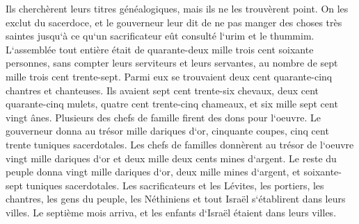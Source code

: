 \verse Ils cherchèrent leurs titres généalogiques, mais ils ne les trouvèrent point. On les exclut du sacerdoce, 
\verse et le gouverneur leur dit de ne pas manger des choses très saintes jusqu`à ce qu`un sacrificateur eût consulté l`urim et le thummim. 
\verse L`assemblée tout entière était de quarante-deux mille trois cent soixante personnes, 
\verse sans compter leurs serviteurs et leurs servantes, au nombre de sept mille trois cent trente-sept. Parmi eux se trouvaient deux cent quarante-cinq chantres et chanteuses. 
\verse Ils avaient sept cent trente-six chevaux, deux cent quarante-cinq mulets, 
\verse quatre cent trente-cinq chameaux, et six mille sept cent vingt ânes. 
\verse Plusieurs des chefs de famille firent des dons pour l`oeuvre. Le gouverneur donna au trésor mille dariques d`or, cinquante coupes, cinq cent trente tuniques sacerdotales. 
\verse Les chefs de familles donnèrent au trésor de l`oeuvre vingt mille dariques d`or et deux mille deux cents mines d`argent. 
\verse Le reste du peuple donna vingt mille dariques d`or, deux mille mines d`argent, et soixante-sept tuniques sacerdotales. 
\verse Les sacrificateurs et les Lévites, les portiers, les chantres, les gens du peuple, les Néthiniens et tout Israël s`établirent dans leurs villes. Le septième mois arriva, et les enfants d`Israël étaient dans leurs villes. 

